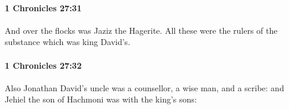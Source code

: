 		\paragraph{1 Chronicles 27:31} %
			\label{1CHRONICLES-27-31}

			And over the flocks was Jaziz the Hagerite. All these were the rulers of the substance which was king David’s.


		\paragraph{1 Chronicles 27:32} %
			\label{1CHRONICLES-27-32}

			Also Jonathan David’s uncle was a counsellor, a wise man, and a scribe: and Jehiel the son of Hachmoni was with the king’s sons:


